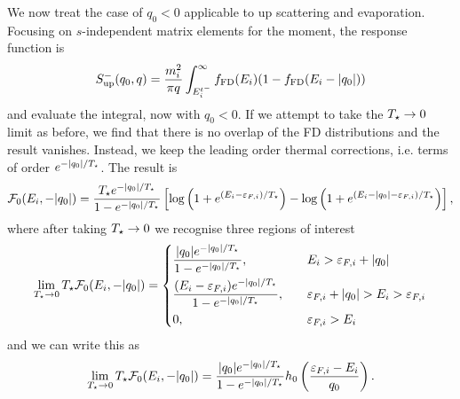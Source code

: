 We now treat the case of $q_0<0$ applicable to up scattering and evaporation. Focusing on $s$-independent matrix elements for the moment, the response function is
\begin{equation}
    S^{-}_\mathrm{up}(q_0, q) = \frac{m_i^2}{\pi q}\int_{E_i^{t^-}}^\infty f_{\rm FD}(E_i)(1 - f_{\rm FD}(E_i -|q_0|))
\end{equation}
and evaluate the integral, now with $q_0 <0$. If we attempt to take the $T_\star\rightarrow 0$ limit as before, we find that there is no overlap of the FD distributions and the result vanishes. Instead, we keep the leading order thermal corrections, i.e. terms of order $e^{-|q_0|/T_\star}$. The result is 
\begin{equation}
        \mathcal{F}_0(E_i, -|q_0|) = \frac{T_\star e^{-|q_0|/T_\star}}{1 - e^{-|q_0|/T_\star}} \left[ \log\left( 1 + e^{(E_i-\varepsilon_{F,i})/T_\star}\right) - \log\left( 1 + e^{(E_i-|q_0|-\varepsilon_{F,i})/T_\star}\right)\right],
\end{equation}
where after taking $T_\star \rightarrow 0$ we recognise three regions of interest
\begin{equation}
    \lim_{T_\star \rightarrow 0}T_\star \mathcal{F}_0(E_i, -|q_0|) = 
    \begin{dcases}
        \frac{|q_0| e^{-|q_0|/T_\star}}{1 - e^{-|q_0|/T_\star}},&\quad E_i>\varepsilon_{F,i} +|q_0|\\  
        \frac{(E_i-\varepsilon_{F,i}) e^{-|q_0|/T_\star}}{1 - e^{-|q_0|/T_\star}},&\quad \varepsilon_{F,i} + |q_0| > E_i > \varepsilon_{F,i}\\
        0, & \quad \varepsilon_{F,i}>E_i
    \end{dcases}
\end{equation}
and we can write this as
\begin{equation}
    \lim_{T_\star \rightarrow 0}T_\star \mathcal{F}_0(E_i, -|q_0|) = \frac{|q_0| e^{-|q_0|/T_\star}}{1 - e^{-|q_0|/T_\star}}h_0\left(\frac{\varepsilon_{F,i} - E_i}{q_0}\right).
\end{equation}

